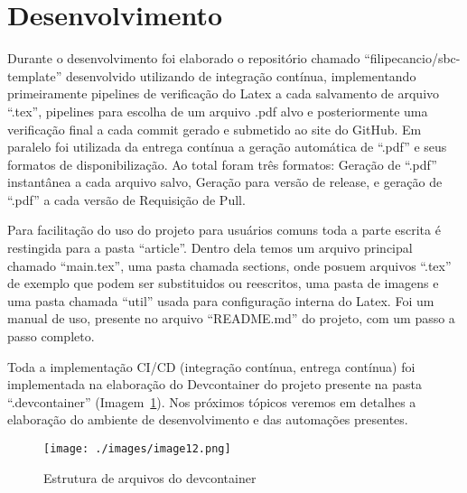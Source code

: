 \section{Desenvolvimento}

Durante o desenvolvimento foi elaborado o repositório chamado ``filipecancio/sbc-template'' desenvolvido utilizando de integração contínua, implementando primeiramente pipelines de verificação do Latex a cada salvamento de arquivo ``.tex'', pipelines para escolha de um arquivo .pdf alvo e posteriormente uma verificação final a cada commit gerado e submetido ao site do GitHub. Em paralelo foi utilizada da entrega contínua a geração automática de ``.pdf'' e seus formatos de disponibilização. Ao total foram três formatos: Geração de ``.pdf'' instantânea a cada arquivo salvo, Geração para versão de release, e geração de ``.pdf'' a cada versão de Requisição de Pull.

Para facilitação do uso do projeto para usuários comuns toda a parte escrita é restingida para a pasta ``article''. Dentro dela temos um arquivo principal chamado ``main.tex'', uma pasta chamada sections, onde posuem arquivos ``.tex'' de exemplo que podem ser substituidos ou reescritos, uma pasta de imagens e uma pasta chamada ``util'' usada para configuração interna do Latex.
Foi um manual de uso, presente no arquivo ``README.md'' do projeto, com um passo a passo completo.

Toda a implementação CI/CD (integração contínua, entrega contínua) foi implementada na elaboração do Devcontainer do projeto presente na pasta ``.devcontainer'' (Imagem~\ref{fig:image12}). Nos próximos tópicos veremos em detalhes a elaboração do ambiente de desenvolvimento e das automações
presentes.

\begin{figure}[ht]
	\centering
	\texttt{[image: ./images/image12.png]}
	\caption{Estrutura de arquivos do devcontainer}
	\label{fig:image12}
\end{figure}
